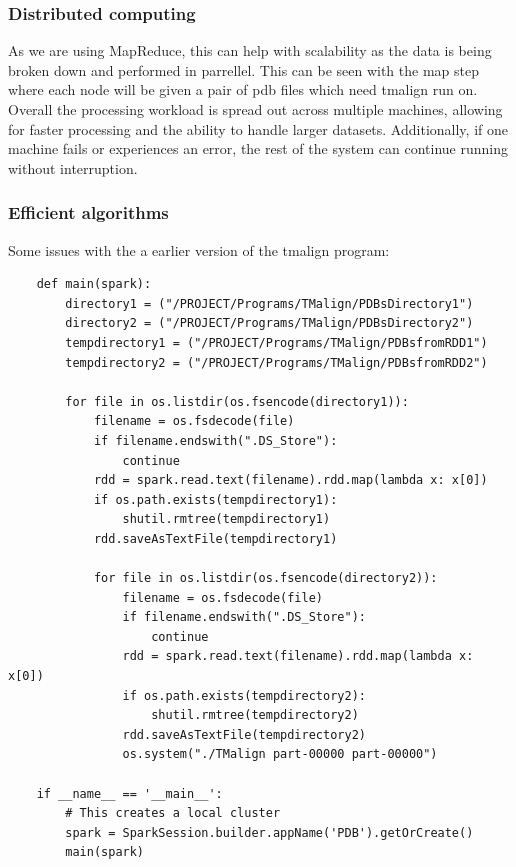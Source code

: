 \documentclass[]{final_report}
\begin{document}
\subsubsection{Distributed computing}
As we are using MapReduce, this can help with scalability as the data is being broken down and performed in parrellel. This can be seen with the map step where each node will be given a pair of pdb files which need tmalign run on. Overall the processing workload is spread out across multiple machines, allowing for faster processing and the ability to handle larger datasets. Additionally, if one machine fails or experiences an error, the rest of the system can continue running without interruption.

\clearpage

\subsubsection{Efficient algorithms}
Some issues with the a earlier version of the tmalign program:

\begin{lstlisting}
    def main(spark):
        directory1 = ("/PROJECT/Programs/TMalign/PDBsDirectory1")
        directory2 = ("/PROJECT/Programs/TMalign/PDBsDirectory2")
        tempdirectory1 = ("/PROJECT/Programs/TMalign/PDBsfromRDD1")
        tempdirectory2 = ("/PROJECT/Programs/TMalign/PDBsfromRDD2")

        for file in os.listdir(os.fsencode(directory1)):
            filename = os.fsdecode(file)
            if filename.endswith(".DS_Store"):
                continue
            rdd = spark.read.text(filename).rdd.map(lambda x: x[0])
            if os.path.exists(tempdirectory1):
                shutil.rmtree(tempdirectory1)
            rdd.saveAsTextFile(tempdirectory1)

            for file in os.listdir(os.fsencode(directory2)):
                filename = os.fsdecode(file)
                if filename.endswith(".DS_Store"):
                    continue
                rdd = spark.read.text(filename).rdd.map(lambda x: x[0])
                if os.path.exists(tempdirectory2):
                    shutil.rmtree(tempdirectory2)
                rdd.saveAsTextFile(tempdirectory2)
                os.system("./TMalign part-00000 part-00000")

    if __name__ == '__main__':
        # This creates a local cluster
        spark = SparkSession.builder.appName('PDB').getOrCreate()
        main(spark)
\end{lstlisting}
\end{document}
